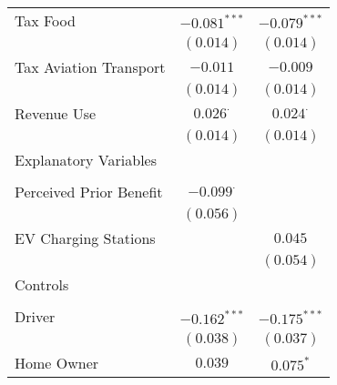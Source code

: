 \begin{center}
\begin{tiny}
\begin{longtable}{l@{} c@{} c@{}}
\quad Tax Food                                                           & $-0.081^{***}$   & $-0.079^{***}$   \\
                                                                         & $(0.014)$        & $(0.014)$        \\
\quad Tax Aviation Transport                                             & $-0.011$         & $-0.009$         \\
                                                                         & $(0.014)$        & $(0.014)$        \\
\quad Revenue Use                                                        & $0.026^{\cdot}$  & $0.024^{\cdot}$  \\
                                                                         & $(0.014)$        & $(0.014)$        \\
Explanatory Variables                                                    &                  &                  \\
                                                                         &                  &                  \\
\quad Perceived Prior Benefit                                            & $-0.099^{\cdot}$ &                  \\
                                                                         & $(0.056)$        &                  \\
\quad EV Charging Stations                                               &                  & $0.045$          \\
                                                                         &                  & $(0.054)$        \\
Controls                                                                 &                  &                  \\
                                                                         &                  &                  \\
\quad Driver                                                             & $-0.162^{***}$   & $-0.175^{***}$   \\
                                                                         & $(0.038)$        & $(0.037)$        \\
\quad Home Owner                                                         & $0.039$          & $0.075^{*}$      \\

\end{longtable}
\end{tiny}
\end{center}
